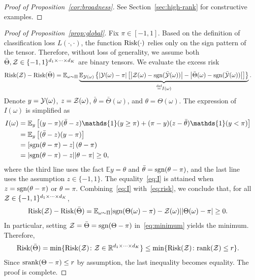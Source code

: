 \documentclass[11pt]{article}
\theoremstyle{plain}
\theoremstyle{definition}
\newcommand*{\KeepStyleUnderBrace}[1]{%
  \mathop{%
    \mathchoice
    {\underbrace{\displaystyle#1}}%
    {\underbrace{\textstyle#1}}%
    {\underbrace{\scriptstyle#1}}%
    {\underbrace{\scriptscriptstyle#1}}%
  }\limits
}
\def\sign{\textup{sgn}}
\def\srank{\textup{srank}}
\def\rank{\textup{rank}}
\def\risk{\textup{Risk}}
\begin{document}
\begin{proof}[Proof of Proposition~\ref{cor:broadness}]
See Section~\ref{sec:high-rank} for constructive examples.
\end{proof}

\begin{proof}[Proof of Proposition~\ref{prop:global}]
Fix $\pi\in[-1,1]$. Based on the definition of classification loss $L(\cdot,\cdot)$, the function $\risk(\cdot)$ relies only on the sign pattern of the tensor. Therefore, without loss of generality, we assume both $\bar \Theta, \mathcal{Z} \in\{-1,1\}^{d_1\times \cdots \times d_K}$ are binary tensors. 
We evaluate the excess risk 
\begin{equation}\label{eq:risk}
\risk(\tZ)- \risk(\bar \Theta) = \mathbb{E}_{\omega\sim \Pi}\KeepStyleUnderBrace{\mathbb{E}_{\tY(\omega)}\left\{|\tY(\omega)-\pi|\left[\left|\tZ(\omega)-\sign(\bar \tY(\omega)) \right|-\left|\bar\Theta(\omega)-\sign(\bar \tY(\omega))\right|\right]\right\}}_{\stackrel{\text{def}}{=}I(\omega)}.
\end{equation}
Denote $y=\mathcal{Y}(\omega)$, $z=\mathcal{Z}(\omega)$, $\bar \theta=\bar\Theta(\omega)$, and $\theta=\Theta(\omega)$. The expression of $I(\omega)$ is simplified as
\begin{align}\label{eq:I}
I(\omega)&= \mathbb{E}_{y}\left[ (y-\pi)(\bar \theta-z)\mathds{1}(y\geq \pi)+(\pi-y)(z-\bar \theta)\mathds{1}(y< \pi)\right]\notag \\
&= \mathbb{E}_{y}\left[(\bar \theta-z) (y-\pi)\right]\notag \\
&=  \left[\sign(\theta-\pi)-z\right]\left(\theta-\pi\right)\notag \\
&= |\sign(\theta-\pi)-z||\theta-\pi|\geq 0,
\end{align}
where the third line uses the fact $\mathbb{E}y=\theta$ and $\bar \theta=\sign(\theta-\pi)$, and the last line uses the assumption $z \in\{-1,1\}$. The equality~\eqref{eq:I} is attained when $z=\sign(\theta-\pi)$ or $\theta=\pi$. Combining~\eqref{eq:I} with~\eqref{eq:risk}, we conclude that, for all $\mathcal{Z}\in\{-1,1\}^{d_1\times \cdots \times d_K}$, 
\begin{equation}\label{eq:minimum}
\risk(\tZ)- \risk(\bar \Theta) = \mathbb{E}_{\omega\sim \Pi} |\sign(\Theta(\omega)-\pi)-\tZ(\omega)||\Theta(\omega)-\pi|\geq 0.
\end{equation}
In particular, setting $\tZ=\bar \Theta=\sign(\Theta-\pi)$ in~\eqref{eq:minimum} yields the minimum. Therefore, 
\[
\risk(\bar \Theta)=\min\{\risk(\tZ)\colon \tZ\in \mathbb{R}^{d_1\times \cdots \times d_K}\} \leq \min\{\risk(\tZ)\colon \rank(\tZ)\leq r\}.
\]
Since $\srank(\Theta-\pi)\leq r$ by assumption, the last inequality becomes equality. The proof is complete. 
\end{proof}
\end{document}
